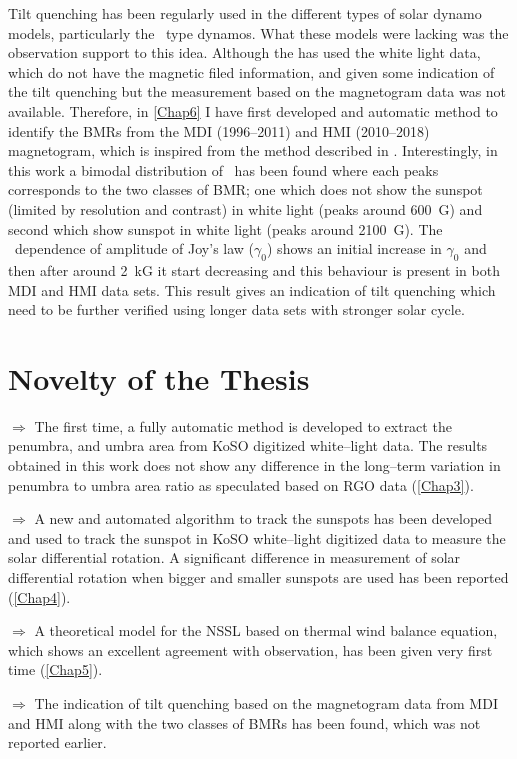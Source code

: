 Tilt quenching has been regularly used in the different types of solar dynamo models, particularly the \bl\ type dynamos. What these models were lacking was the observation support to this idea. Although the \citet{DasiEspuig2010} has used the white light data, which do not have the magnetic filed information, and given some indication of the tilt quenching but the measurement based on the magnetogram data was not available. Therefore, in \cref{Chap6} I have first developed and automatic method to identify the BMRs from the MDI (1996--2011) and HMI (2010--2018) magnetogram, which is inspired from the method described in \citet{Stenflo2012a}. Interestingly, in this work a bimodal distribution of \Bmax\ has been found where each peaks corresponds to the two classes of BMR; one which does not show the sunspot (limited by resolution and contrast) in white light (peaks around 600~G) and second which show sunspot in white light (peaks around 2100~G). The \Bmax\ dependence of amplitude of Joy's law ($\gamma_0$) shows an initial increase in $\gamma_0$ and then after around 2~kG it start decreasing and this behaviour is present in both MDI and HMI data sets. This result gives an indication of tilt quenching which need to be further verified using longer data sets with stronger solar cycle.


\section{Novelty of the Thesis}

$\bm{\Rightarrow}$ The first time, a fully automatic method is developed to extract the penumbra, and umbra area from KoSO digitized white--light data. The results obtained in this work does not show any difference in the long--term variation in penumbra to umbra area ratio as speculated based on RGO data (\cref{Chap3}).

$\bm{\Rightarrow}$ A new and automated algorithm to track the sunspots has been developed and used to track the sunspot in KoSO white--light digitized data to measure the solar differential rotation. A significant difference in measurement of solar differential rotation when bigger and smaller sunspots are used has been reported (\cref{Chap4}).

$\bm{\Rightarrow}$ A theoretical model for the NSSL based on thermal wind balance equation, which shows an excellent agreement with observation,  has been given very first time (\cref{Chap5}).

$\bm{\Rightarrow}$ The indication of tilt quenching based on the magnetogram data from MDI and HMI along with the two classes of BMRs has been found, which was not reported earlier. 

